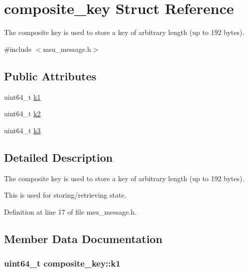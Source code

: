 \hypertarget{structcomposite__key}{\section{composite\-\_\-key Struct Reference}
\label{structcomposite__key}
}


The composite key is used to store a key of arbitrary length (up to 192 bytes).  




{\ttfamily \#include $<$msu\-\_\-message.\-h$>$}

\subsection*{Public Attributes}
\begin{DoxyCompactItemize}
\item 
uint64\-\_\-t \hyperlink{structcomposite__key_a6ec9a3517aa9f50dd7683adcd12c67e1}{k1}
\item 
uint64\-\_\-t \hyperlink{structcomposite__key_acc0a164822bca688f71dfa2d2ef2f536}{k2}
\item 
uint64\-\_\-t \hyperlink{structcomposite__key_a6a97650be5bd7102fca8a17b82c88bb5}{k3}
\end{DoxyCompactItemize}


\subsection{Detailed Description}
The composite key is used to store a key of arbitrary length (up to 192 bytes). 

This is used for storing/retrieving state. 

Definition at line 17 of file msu\-\_\-message.\-h.



\subsection{Member Data Documentation}
\hypertarget{structcomposite__key_a6ec9a3517aa9f50dd7683adcd12c67e1}{
\subsubsection[{k1}]{\setlength{\rightskip}{0pt plus 5cm}uint64\-\_\-t composite\-\_\-key\-::k1}}\label{structcomposite__key_a6ec9a3517aa9f50dd7683adcd12c67e1}


